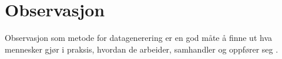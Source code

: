 \section{Observasjon}
\label{section:observasjon} 

\noindent
Observasjon som metode for datagenerering er en god måte å finne ut hva mennesker gjør i praksis, hvordan de arbeider, samhandler og oppfører seg \cite{Oates}.